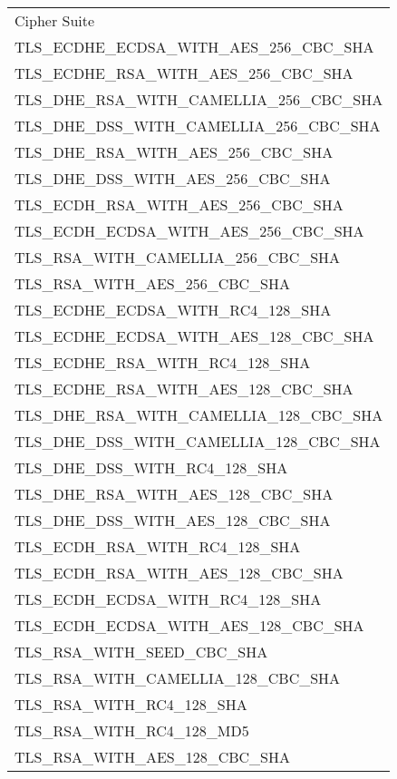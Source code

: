 \documentclass{article}
\begin{document}
\begin{table}[h!]
\begin{tabular}{l}
Cipher Suite                                 \\
TLS\_ECDHE\_ECDSA\_WITH\_AES\_256\_CBC\_SHA  \\
TLS\_ECDHE\_RSA\_WITH\_AES\_256\_CBC\_SHA    \\
TLS\_DHE\_RSA\_WITH\_CAMELLIA\_256\_CBC\_SHA \\
TLS\_DHE\_DSS\_WITH\_CAMELLIA\_256\_CBC\_SHA \\
TLS\_DHE\_RSA\_WITH\_AES\_256\_CBC\_SHA      \\
TLS\_DHE\_DSS\_WITH\_AES\_256\_CBC\_SHA      \\
TLS\_ECDH\_RSA\_WITH\_AES\_256\_CBC\_SHA     \\
TLS\_ECDH\_ECDSA\_WITH\_AES\_256\_CBC\_SHA   \\
TLS\_RSA\_WITH\_CAMELLIA\_256\_CBC\_SHA      \\
TLS\_RSA\_WITH\_AES\_256\_CBC\_SHA           \\
TLS\_ECDHE\_ECDSA\_WITH\_RC4\_128\_SHA       \\
TLS\_ECDHE\_ECDSA\_WITH\_AES\_128\_CBC\_SHA  \\
TLS\_ECDHE\_RSA\_WITH\_RC4\_128\_SHA         \\
TLS\_ECDHE\_RSA\_WITH\_AES\_128\_CBC\_SHA    \\
TLS\_DHE\_RSA\_WITH\_CAMELLIA\_128\_CBC\_SHA \\
TLS\_DHE\_DSS\_WITH\_CAMELLIA\_128\_CBC\_SHA \\
TLS\_DHE\_DSS\_WITH\_RC4\_128\_SHA           \\
TLS\_DHE\_RSA\_WITH\_AES\_128\_CBC\_SHA      \\
TLS\_DHE\_DSS\_WITH\_AES\_128\_CBC\_SHA      \\
TLS\_ECDH\_RSA\_WITH\_RC4\_128\_SHA          \\
TLS\_ECDH\_RSA\_WITH\_AES\_128\_CBC\_SHA     \\
TLS\_ECDH\_ECDSA\_WITH\_RC4\_128\_SHA        \\
TLS\_ECDH\_ECDSA\_WITH\_AES\_128\_CBC\_SHA   \\
TLS\_RSA\_WITH\_SEED\_CBC\_SHA               \\
TLS\_RSA\_WITH\_CAMELLIA\_128\_CBC\_SHA      \\
TLS\_RSA\_WITH\_RC4\_128\_SHA                \\
TLS\_RSA\_WITH\_RC4\_128\_MD5                \\
TLS\_RSA\_WITH\_AES\_128\_CBC\_SHA           \\

\end{tabular}
\end{table}
\end{document}
